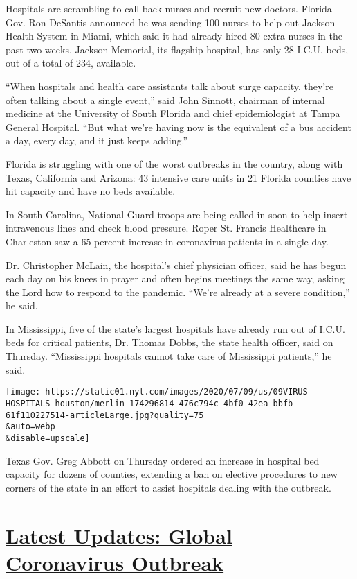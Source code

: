 Hospitals are scrambling to call back nurses and recruit new doctors.
Florida Gov. Ron DeSantis announced he was sending 100 nurses to help
out Jackson Health System in Miami, which said it had already hired 80
extra nurses in the past two weeks. Jackson Memorial, its flagship
hospital, has only 28 I.C.U. beds, out of a total of 234, available.

``When hospitals and health care assistants talk about surge capacity,
they're often talking about a single event,'' said John Sinnott,
chairman of internal medicine at the University of South Florida and
chief epidemiologist at Tampa General Hospital. ``But what we're having
now is the equivalent of a bus accident a day, every day, and it just
keeps adding.''

Florida is struggling with one of the worst outbreaks in the country,
along with Texas, California and Arizona: 43 intensive care units in 21
Florida counties have hit capacity and have no beds available.

In South Carolina, National Guard troops are being called in soon to
help insert intravenous lines and check blood pressure. Roper St.
Francis Healthcare in Charleston saw a 65 percent increase in
coronavirus patients in a single day.

Dr. Christopher McLain, the hospital's chief physician officer, said he
has begun each day on his knees in prayer and often begins meetings the
same way, asking the Lord how to respond to the pandemic. ``We're
already at a severe condition,'' he said.

In Mississippi, five of the state's largest hospitals have already run
out of I.C.U. beds for critical patients, Dr. Thomas Dobbs, the state
health officer, said on Thursday. ``Mississippi hospitals cannot take
care of Mississippi patients,'' he said.

\texttt{[image: https://static01.nyt.com/images/2020/07/09/us/09VIRUS-HOSPITALS-houston/merlin\_174296814\_476c794c-4bf0-42ea-bbfb-61f110227514-articleLarge.jpg?quality=75\\\&auto=webp\\\&disable=upscale]}

Texas Gov. Greg Abbott on Thursday ordered an increase in hospital bed
capacity for dozens of counties, extending a ban on elective procedures
to new corners of the state in an effort to assist hospitals dealing
with the outbreak.

\hypertarget{latest-updates-global-coronavirus-outbreak}{%
\section{\texorpdfstring{\href{https://www.nytimes.com/2020/08/01/world/coronavirus-covid-19.html?action=click\&pgtype=Article\&state=default\&region=MAIN_CONTENT_1\&context=storylines_live_updates}{Latest
Updates: Global Coronavirus
Outbreak}}{Latest Updates: Global Coronavirus Outbreak}}\label{latest-updates-global-coronavirus-outbreak}}

